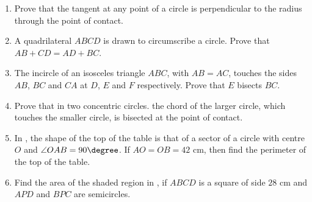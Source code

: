 \begin{enumerate}
\begin{figure}[ht]
\caption{}
\label{2012_c_fig16}
\end{figure}
\item Prove that the tangent at any point of a circle is perpendicular to the radius through the point of contact. 

\item A quadrilateral $ABCD$ is drawn to circumscribe a circle. Prove that $AB + CD = AD + BC$. 

\item The incircle of an isosceles triangle $ABC$, with $AB = AC$, touches the sides $AB$, $BC$ and $CA$ at $D$, $E$ and $F$ respectively. Prove that $E$ bisects $BC$. 

\item Prove that in two concentric circles. the chord of the larger circle, which touches the smaller circle, is bisected at the point of contact. 

\item In , the shape of the top of the table is that of a sector of a circle with centre $O$ and $\angle OAB = 90\degree$. If $AO = OB = 42\text{ cm}$, then find the perimeter of the top of the table.
\begin{figure}[ht]
\centering
{}
\caption{}
\label{2012_c_fig17}
\end{figure}
\item Find the area of the shaded region in , if $ABCD$ is a square of side $28\text{ cm}$ and $APD$ and $BPC$ are semicircles.
\begin{figure}[ht]
\centering
{}
\end{figure}
\end{enumerate}
